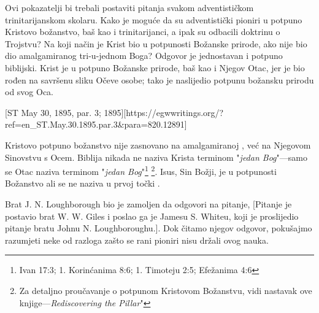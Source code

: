 Ovi pokazatelji bi trebali postaviti pitanja svakom adventističkom trinitarijanskom skolaru. Kako je moguće da su adventistički pioniri u potpuno Kristovo božanstvo, baš kao i trinitarijanci, a ipak su odbacili doktrinu o Trojstvu? Na koji način je Krist bio u potpunosti Božanske prirode, ako nije bio dio amalgamiranog tri-u-jednom Boga? Odgovor je jednostavan i potpuno biblijski. Krist je u potpuno Božanske prirode, baš kao i Njegov Otac, jer je bio rođen na savršenu sliku Očeve osobe; tako je naslijedio potpunu božansku prirodu od svog Oca.

[ST May 30, 1895, par. 3; 1895][https://egwwritings.org/?ref=en\_ST.May.30.1895.par.3&para=820.12891]

Kristovo potpuno božanstvo nije zasnovano na amalgamiranoj , već na Njegovom Sinovstvu s Ocem. Biblija nikada ne naziva Krista terminom "\textit{jedan Bog}"—samo se Otac naziva terminom "\textit{jedan Bog}"\footnote{Ivan 17:3; 1. Korinćanima 8:6; 1. Timoteju 2:5; Efežanima 4:6} \footnote{Za detaljno proučavanje o potpunom Kristovom Božanstvu, vidi nastavak ove knjige—\textit{Rediscovering the Pillar}"}. Isus, Sin Božji, je u potpunosti Božanstvo ali se ne naziva  u prvoj točki .


Brat J. N. Loughborough bio je zamoljen da odgovori na pitanje, [Pitanje je postavio brat W. W. Giles i poslao ga je Jamesu S. Whiteu, koji je proslijedio pitanje bratu Johnu N. Loughboroughu.]. Dok čitamo njegov odgovor, pokušajmo razumjeti neke od razloga zašto se rani pioniri nisu držali ovog nauka.


